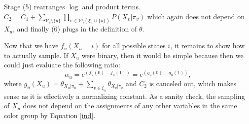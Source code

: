 \documentclass{article} %
\begin{document}
Stage (5) rearranges $\log$ and product terms. $C_2 = C_1 + \sum\limits_{ \mathcal{V}_c \setminus
\{u\}}\prod\limits_{v \in \mathcal{V} \setminus (\xi_u \cup \{u\})} P(X_v | \pi_v)$ which again does
not depend on $X_u$, and finally (6) plugs in the definition of $\theta$.

Now that we have $f_u(X_u = i)$ for all possible states $i$, it remains to show how to actually
sample. If $X_u$ were binary, then it would be simple because then we could just evaluate the
following ratio:
\begin{equation}
\alpha_u = {e^{(f_u(0)-f_u(1))}} = {e^{(g_u(0)-g_u(1))}} ,
\end{equation}\label{alpha}
where $g_u(X_u) = \theta_{X_u | \pi_u} + \sum\limits_{v \in \xi_u} \theta_{X_v | \pi_v}$ and $C_2$
is canceled out, which makes sense as it is effectively a normalizing constant. As a sanity check,
the sampling of $X_u$ does not depend on the assignments of any other variables in the same color
group by Equation \ref{ind}.
\end{document}
